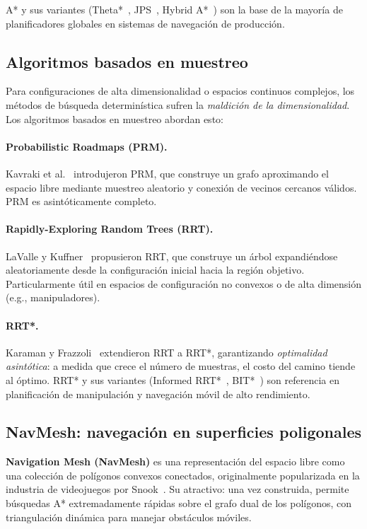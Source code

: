 \documentclass[12pt,a4paper,oneside]{book}
\begin{document}
A* y sus variantes (Theta*~\cite{Daniel2010}, JPS~\cite{Harabor2011}, Hybrid A*~\cite{Dolgov2010}) son la base de la mayoría de planificadores globales en sistemas de navegación de producción.

\subsection{Algoritmos basados en muestreo}

Para configuraciones de alta dimensionalidad o espacios continuos complejos, los métodos de búsqueda determinística sufren la \emph{maldición de la dimensionalidad}. Los algoritmos basados en muestreo abordan esto:

\paragraph{Probabilistic Roadmaps (PRM).} Kavraki et al.~\cite{Kavraki1996} introdujeron PRM, que construye un grafo aproximando el espacio libre mediante muestreo aleatorio y conexión de vecinos cercanos válidos. PRM es asintóticamente completo.

\paragraph{Rapidly-Exploring Random Trees (RRT).} LaValle y Kuffner~\cite{LaValle1998,LaValle2001} propusieron RRT, que construye un árbol expandiéndose aleatoriamente desde la configuración inicial hacia la región objetivo. Particularmente útil en espacios de configuración no convexos o de alta dimensión (e.g., manipuladores).

\paragraph{RRT*.} Karaman y Frazzoli~\cite{Karaman2011} extendieron RRT a RRT*, garantizando \emph{optimalidad asintótica}: a medida que crece el número de muestras, el costo del camino tiende al óptimo. RRT* y sus variantes (Informed RRT*~\cite{Gammell2014}, BIT*~\cite{Gammell2015}) son referencia en planificación de manipulación y navegación móvil de alto rendimiento.

\subsection{NavMesh: navegación en superficies poligonales}

\textbf{Navigation Mesh (NavMesh)} es una representación del espacio libre como una colección de polígonos convexos conectados, originalmente popularizada en la industria de videojuegos por Snook~\cite{Snook2000}. Su atractivo: una vez construida, permite búsquedas A* extremadamente rápidas sobre el grafo dual de los polígonos, con triangulación dinámica para manejar obstáculos móviles.
\end{document}

